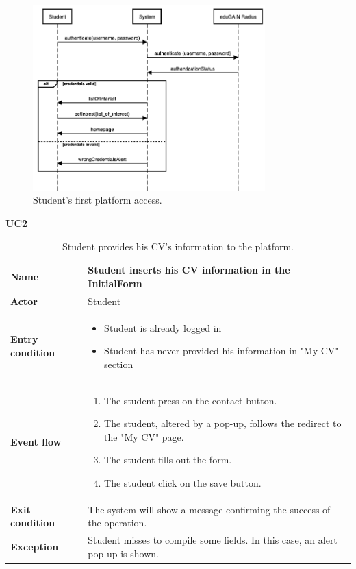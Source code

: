     \begin{figure}[H]
        \centering
        \includegraphics[width=0.8\textwidth]{Assets/SequenceDiagrams/1-login.png}
        \caption{Student's first platform access.}
        \label{fig:Student's first platform access}
    \end{figure}


    \textbf{UC2}
    \begin{table}[H]
    \centering
    \begin{tabular}{|l|p{11.9cm}|}
        \hline
        \textbf{Name}            & Student inserts his CV information in the InitialForm
        \\\hline
        \textbf{Actor}           & Student         \\\hline
        \textbf{Entry condition} &
        \begin{itemize}
              \item Student is already logged in
              \item Student has never provided his information in "My CV" section
        \end{itemize}                                        \\\hline
        \textbf{Event flow}      &
        \begin{enumerate}[label=\arabic*.]
            \item The student press on the contact button.
            \item The student, altered by a pop-up, follows the redirect to the "My CV" page.
            \item The student fills out the form.
            \item The student click on the save button.
        \end{enumerate}            \\\hline
        \textbf{Exit condition}  & The system will show a message confirming the success of the operation.\\\hline
        
        \textbf{Exception}       &  Student misses to compile some fields. In this case, an alert pop-up is shown.  \\\hline
    \end{tabular}
    \caption{Student provides his CV’s information to the platform.}
    \label{table:Student provides his CV’s information to the platform}
    \end{table}

